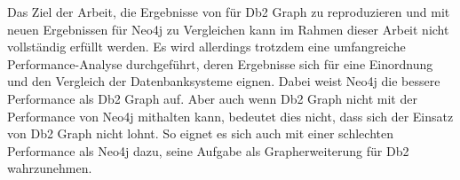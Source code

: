 Das Ziel der Arbeit, die Ergebnisse von  für Db2 Graph zu reproduzieren und mit neuen Ergebnissen für Neo4j zu Vergleichen kann im Rahmen dieser Arbeit nicht vollständig erfüllt werden. Es wird allerdings trotzdem eine umfangreiche Performance-Analyse durchgeführt, deren Ergebnisse sich für eine Einordnung und den Vergleich der Datenbanksysteme eignen. Dabei weist Neo4j die bessere Performance als Db2 Graph auf. Aber auch wenn Db2 Graph nicht mit der Performance von Neo4j mithalten kann, bedeutet dies nicht, dass sich der Einsatz von Db2 Graph nicht lohnt. So eignet es sich auch mit einer schlechten Performance als Neo4j dazu, seine Aufgabe als Grapherweiterung für Db2 wahrzunehmen.
